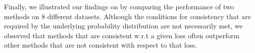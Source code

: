 Finally, we illustrated our findings on by comparing the performance of two methods on 8 different datasets. Although the conditions for consistency that are required by the underlying probability distribution are not necessarily met, we observed that methods that are consistent w.r.t a given loss often outperform other methods that are not consistent with respect to that loss.


\newpage

% 






